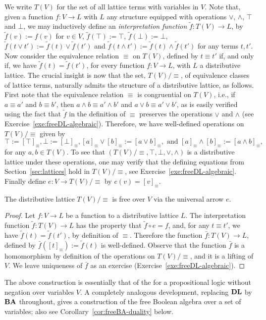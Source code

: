   We write $T(V)$ for the set of all lattice terms with variables in $V$.
  Note that, given a function $f \colon V \to L$ with $L$ any structure equipped with operations $\vee$, $\wedge$, $\top$ and $\bot$, we may inductively define an \emph{interpretation function} $\tilde{f} \colon T(V) \to L$, by $\tilde{f}(v) := f(v)$ for $v \in V$, $\tilde{f}(\top) := \top$, $\tilde{f}(\bot) := \bot$, $\tilde{f}(t \vee t') := \tilde{f}(t) \vee \tilde{f}(t')$ and $\tilde{f}(t \wedge t') := \tilde{f}(t) \wedge \tilde{f}(t')$ for any terms $t, t'$. Now consider the equivalence relation $\equiv$ on $T(V)$, defined by $t \equiv t'$ if, and only if, we have $\tilde{f}(t) = \tilde{f}(t')$, for every function  $f \colon V \to L$,  with $L$ a distributive lattice. The crucial insight is now that the set, $T(V)/{\equiv}$, of equivalence classes of lattice terms,  naturally admits the structure of a distributive lattice, as follows. First note that the equivalence relation $\equiv$ is congruential on $T(V)$, i.e., if $a \equiv a'$ and $b \equiv b'$, then $a \wedge b \equiv a' \wedge b'$ and $a \vee b \equiv a' \vee b'$, as is easily verified using the fact that $\tilde{f}$ in the definition of $\equiv$ preserves the operations $\vee$ and $\wedge$ (see Exercise~\ref{exe:freeDL-algebraic}). Therefore, we have well-defined operations on $T(V)/{\equiv}$ given by 
  \[ \top := [\top]_\equiv, \bot := [\bot]_\equiv, [a]_{\equiv} \vee [b]_{\equiv} := [a \vee b]_{\equiv}, \text{ and } [a]_{\equiv} \wedge [b]_{\equiv} := [a \wedge b]_{\equiv},\] 
  for any $a, b \in T(V)$.
  To see that $(T(V)/{\equiv}, \top, \bot, \vee, \wedge)$ is a distributive lattice under these operations, one may verify that the defining equations from Section~\ref{sec:lattices} hold in $T(V)/{\equiv}$, see Exercise~\ref{exe:freeDL-algebraic}.
  Finally define $e\colon V\to T(V)/{\equiv}$ by $e(v)=[v]_{\equiv}$.
  \begin{proposition}\label{prop:freeDL-algebraic}
  The distributive lattice $T(V)/{\equiv}$ is free over $V$ via the universal arrow $e$.
  \end{proposition}
  \begin{proof}
  Let $f \colon V \to L$ be a function to a distributive lattice $L$. The  interpretation function $\tilde{f} \colon T(V) \to L$ has the property that $\tilde{f} \circ e = f$, and, for any $t \equiv t'$, we have $\tilde{f}(t) = \tilde{f}(t')$, by definition of $\equiv$. Therefore the function $\bar{f} \colon T(V) \to L$, defined by $\bar{f}([t]_{\equiv}) := \tilde{f}(t)$ is well-defined. Observe that the function $\bar{f}$ is a homomorphism by definition of the operations on $T(V)/{\equiv}$, and it is a lifting of $V$. We leave uniqueness of $\bar{f}$ as an exercise (Exercise~\ref{exe:freeDL-algebraic}). 
  \end{proof}
  \begin{remark}\label{rem:LT-algebra}
  The above construction is essentially that of the  for a propositional logic without negation over variables $V$. A completely analogous development, replacing $\mathbf{DL}$ by $\mathbf{BA}$ throughout, gives a construction of the free Boolean algebra over a set of variables; also see Corollary~\ref{cor:freeBA-duality} below.
  \end{remark}
  
